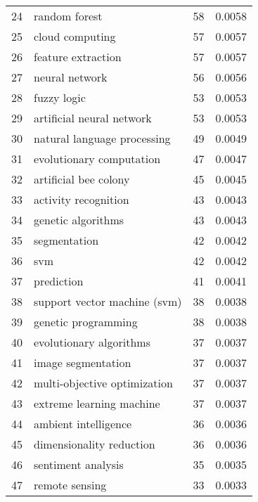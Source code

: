\begin{tabular}{llrr}
24 &                    random forest &          58 &      0.0058 \\
25 &                  cloud computing &          57 &      0.0057 \\
26 &               feature extraction &          57 &      0.0057 \\
27 &                   neural network &          56 &      0.0056 \\
28 &                      fuzzy logic &          53 &      0.0053 \\
29 &        artificial neural network &          53 &      0.0053 \\
30 &      natural language processing &          49 &      0.0049 \\
31 &         evolutionary computation &          47 &      0.0047 \\
32 &            artificial bee colony &          45 &      0.0045 \\
33 &             activity recognition &          43 &      0.0043 \\
34 &               genetic algorithms &          43 &      0.0043 \\
35 &                     segmentation &          42 &      0.0042 \\
36 &                              svm &          42 &      0.0042 \\
37 &                       prediction &          41 &      0.0041 \\
38 &     support vector machine (svm) &          38 &      0.0038 \\
39 &              genetic programming &          38 &      0.0038 \\
40 &          evolutionary algorithms &          37 &      0.0037 \\
41 &               image segmentation &          37 &      0.0037 \\
42 &     multi-objective optimization &          37 &      0.0037 \\
43 &         extreme learning machine &          37 &      0.0037 \\
44 &             ambient intelligence &          36 &      0.0036 \\
45 &         dimensionality reduction &          36 &      0.0036 \\
46 &               sentiment analysis &          35 &      0.0035 \\
47 &                   remote sensing &          33 &      0.0033 \\

\end{tabular}
